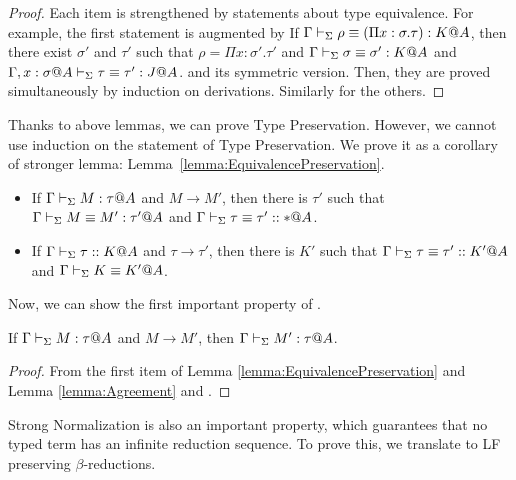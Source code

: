 \begin{proof}
  Each item is strengthened by statements about type equivalence.
    For example, the first statement is augmented by
      If ${\Gamma \vdash_\Sigma \rho \equiv (\Pi x:\sigma.\tau) : K @A}$, then there exist
      $\sigma'$ and $\tau'$ such that ${\rho = \Pi x:\sigma'.\tau'}$ and
      ${\Gamma \vdash_\Sigma \sigma \equiv \sigma' : K @A}$ and
      ${\G, x:\sigma@A\V \tau \E \tau' : J @A}$.
  and its symmetric version. Then, they are proved simultaneously by induction
    on derivations. Similarly for the others.
\end{proof}


Thanks to above lemmas, we can prove Type Preservation. However, we cannot use
induction on the statement of Type Preservation. We prove it as a corollary of
stronger lemma: Lemma~\ref{lemma:EquivalencePreservation}.

\begin{lemma}
    \label{lemma:EquivalencePreservation}
    \begin{itemize}
        \item If \( \Gamma \vdash_\Sigma M : \tau @ A \) and \( M \longrightarrow M' \), then there is \( \tau' \) such that \( \Gamma \vdash_\Sigma M \equiv M' : \tau' @ A \) and \( \Gamma \vdash_\Sigma \tau \equiv \tau' :: * @ A\).
        \item If \( \Gamma \vdash_\Sigma \tau :: K @ A \) and \( \tau \longrightarrow \tau' \), then there is \( K' \) such that \( \Gamma \vdash_\Sigma \tau \equiv \tau' :: K' @ A \) and \( \Gamma \vdash_\Sigma K \equiv K' @ A\).
    \end{itemize}
\end{lemma}

Now, we can show the first important property of \LMD.

\begin{theorem}
    \label{theorem:TypePreservation}
    If \( \Gamma \vdash_\Sigma M : \tau @ A \) and \( M \longrightarrow M' \), then \( \Gamma \vdash_\Sigma M' : \tau @ A \).
\end{theorem}

\begin{proof}
    From the first item of Lemma \ref{lemma:EquivalencePreservation} and Lemma \ref{lemma:Agreement} and \TConv.
\end{proof}


Strong Normalization is also an important property, which guarantees that no
typed term has an infinite reduction sequence. To prove this, we translate \LMD
to LF~\cite{HarperHonsellPlotkin1993Framework} preserving \( \beta \)-reductions.

